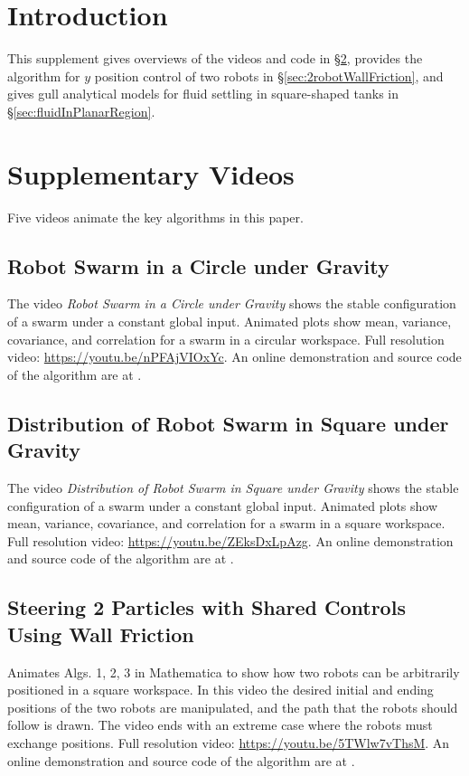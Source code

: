 \documentclass[conference]{IEEEtran}
\begin{document}
\IEEEpeerreviewmaketitle

\section{Introduction}
This supplement gives overviews of the videos and code in 
\S \ref{sec:Videos}, 
provides the algorithm for $y$ position control of two robots in
\S \ref{sec:2robotWallFriction},
and gives gull analytical models for fluid settling in square-shaped tanks in
\S \ref{sec:fluidInPlanarRegion}.


\section{Supplementary Videos}\label{sec:Videos}
Five videos animate the key algorithms in this paper.

\subsection{Robot Swarm in a Circle under Gravity}
The video \emph{Robot Swarm in a Circle under Gravity} shows the stable configuration of a swarm under a constant global input.  Animated plots show mean, variance, covariance, and correlation for a swarm in a circular workspace.
Full resolution video: \url{https://youtu.be/nPFAjVIOxYc}.
An online demonstration and source code of the algorithm are at \citet{Zhao2016mathematicaSquare}.

\subsection{Distribution of Robot Swarm in Square under Gravity }
The video \emph{Distribution of Robot Swarm in Square under Gravity } shows the stable configuration of a swarm under a constant global input.  Animated plots show mean, variance, covariance, and correlation for a swarm in a square workspace.
Full resolution video: \url{https://youtu.be/ZEksDxLpAzg}.
An online demonstration and source code of the algorithm are at \citet{Zhao2016mathematica}.


\subsection{Steering 2 Particles with Shared Controls Using Wall Friction}
Animates Algs. 1, 2, 3 in Mathematica to show how two robots can be arbitrarily positioned in a square workspace. In this video the desired initial and ending positions of the two robots are manipulated, and the path that the robots should follow is drawn. The video ends with an extreme case where the robots must exchange positions. 
Full resolution video: \url{https://youtu.be/5TWlw7vThsM}.
An online demonstration and source code of the algorithm are at \citet{Shahrokhi2015mathematicaParticle}.
\end{document}
